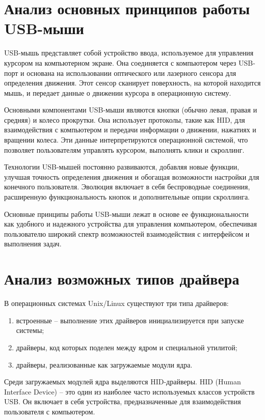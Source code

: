 \documentclass{bmstu}
\begin{document}
\section{Анализ основных принципов работы USB-мыши}

USB-мышь представляет собой устройство ввода, используемое для управления курсором на компьютерном экране. Она соединяется с компьютером через USB-порт и основана на использовании оптического или лазерного сенсора для определения движения. Этот сенсор сканирует поверхность, на которой находится мышь, и передает данные о движении курсора в операционную систему.

Основными компонентами USB-мыши являются кнопки (обычно левая, правая и средняя) и колесо прокрутки. Она использует протоколы, такие как HID, для взаимодействия с компьютером и передачи информации о движении, нажатиях и вращении колеса. Эти данные интерпретируются операционной системой, что позволяет пользователям управлять курсором, выполнять клики и скроллинг.

Технологии USB-мышей постоянно развиваются, добавляя новые функции, улучшая точность определения движения и обогащая возможности настройки для конечного пользователя. Эволюция включает в себя беспроводные соединения, расширенную функциональность кнопок и дополнительные опции скроллинга.

Основные принципы работы USB-мыши лежат в основе ее функциональности как удобного и надежного устройства для управления компьютером, обеспечивая пользователю широкий спектр возможностей взаимодействия с интерфейсом и выполнения задач.

\section{Анализ возможных типов драйвера}

В операционных системах Unix/Linux существуют три типа драйверов:

\begin{enumerate}
	\item встроенные -- выполнение этих драйверов инициализируется при запуске системы;
	\item драйверы, код которых поделен между ядром и специальной утилитой;
	\item драйверы, реализованные как загружаемые модули ядра.
\end{enumerate}

Среди загружаемых модулей ядра выделяются HID-драйверы. HID (Human Interface Device) -- это один из наиболее часто используемых классов устройств USB. Он включает в себя устройства, предназначенные для взаимодействия пользователя с компьютером.
\end{document}
